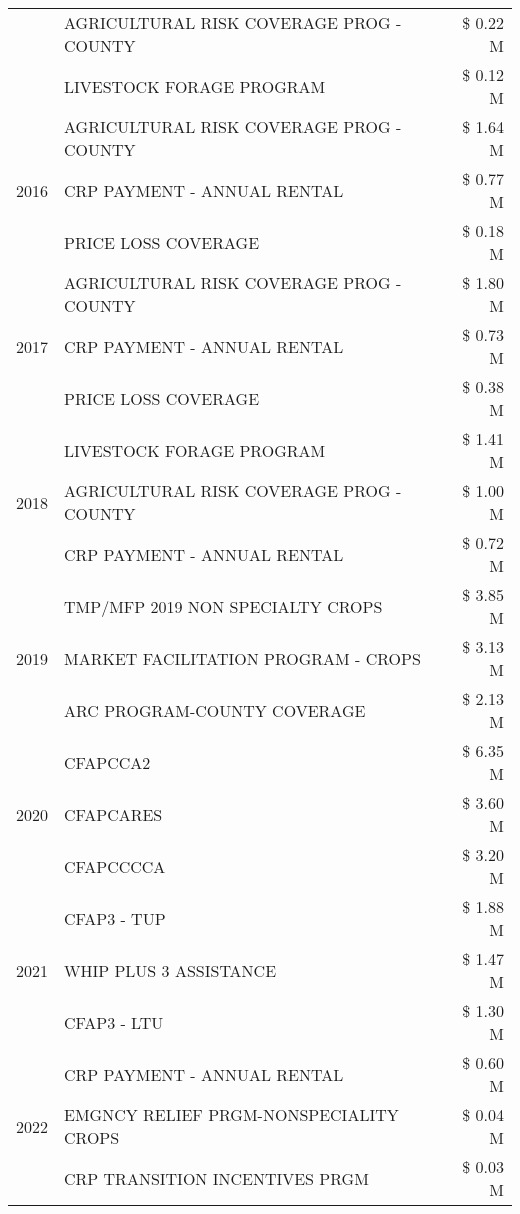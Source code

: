 \begin{tabular}{llr}
 & AGRICULTURAL RISK COVERAGE PROG - COUNTY & \$ 0.22 M \\
 & LIVESTOCK FORAGE PROGRAM & \$ 0.12 M \\
\cline{1-3}
\multirow[t]{3}{*}{2016} & AGRICULTURAL RISK COVERAGE PROG - COUNTY & \$ 1.64 M \\
 & CRP PAYMENT - ANNUAL RENTAL & \$ 0.77 M \\
 & PRICE LOSS COVERAGE & \$ 0.18 M \\
\cline{1-3}
\multirow[t]{3}{*}{2017} & AGRICULTURAL RISK COVERAGE PROG - COUNTY & \$ 1.80 M \\
 & CRP PAYMENT - ANNUAL RENTAL & \$ 0.73 M \\
 & PRICE LOSS COVERAGE & \$ 0.38 M \\
\cline{1-3}
\multirow[t]{3}{*}{2018} & LIVESTOCK FORAGE PROGRAM & \$ 1.41 M \\
 & AGRICULTURAL RISK COVERAGE PROG - COUNTY & \$ 1.00 M \\
 & CRP PAYMENT - ANNUAL RENTAL & \$ 0.72 M \\
\cline{1-3}
\multirow[t]{3}{*}{2019} & TMP/MFP 2019 NON SPECIALTY CROPS & \$ 3.85 M \\
 & MARKET FACILITATION PROGRAM - CROPS & \$ 3.13 M \\
 & ARC PROGRAM-COUNTY COVERAGE & \$ 2.13 M \\
\cline{1-3}
\multirow[t]{3}{*}{2020} & CFAPCCA2 & \$ 6.35 M \\
 & CFAPCARES & \$ 3.60 M \\
 & CFAPCCCCA & \$ 3.20 M \\
\cline{1-3}
\multirow[t]{3}{*}{2021} & CFAP3 - TUP & \$ 1.88 M \\
 & WHIP PLUS 3 ASSISTANCE & \$ 1.47 M \\
 & CFAP3 - LTU & \$ 1.30 M \\
\cline{1-3}
\multirow[t]{3}{*}{2022} & CRP PAYMENT - ANNUAL RENTAL & \$ 0.60 M \\
 & EMGNCY RELIEF PRGM-NONSPECIALITY CROPS & \$ 0.04 M \\
 & CRP TRANSITION INCENTIVES PRGM & \$ 0.03 M \\
\cline{1-3}
\bottomrule
\end{tabular}
